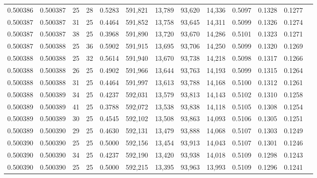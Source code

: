 \begin{tabular}{rrrrrrrrrrrrr}
0.500386 & 0.500387 &    25 &  28 &                                     0.5283 & 591,821 &  13,789 &  93,620 &  14,336 & 0.5097 & 0.1328 & 0.1277 \\
0.500387 & 0.500387 &    31 &  25 &                                     0.4464 & 591,852 &  13,758 &  93,645 &  14,311 & 0.5099 & 0.1326 & 0.1274 \\
0.500387 & 0.500387 &    38 &  25 &                                     0.3968 & 591,890 &  13,720 &  93,670 &  14,286 & 0.5101 & 0.1323 & 0.1271 \\
0.500387 & 0.500388 &    25 &  36 &                                     0.5902 & 591,915 &  13,695 &  93,706 &  14,250 & 0.5099 & 0.1320 & 0.1269 \\
0.500388 & 0.500388 &    25 &  32 &                                     0.5614 & 591,940 &  13,670 &  93,738 &  14,218 & 0.5098 & 0.1317 & 0.1266 \\
0.500388 & 0.500388 &    26 &  25 &                                     0.4902 & 591,966 &  13,644 &  93,763 &  14,193 & 0.5099 & 0.1315 & 0.1264 \\
0.500388 & 0.500388 &    31 &  25 &                                     0.4464 & 591,997 &  13,613 &  93,788 &  14,168 & 0.5100 & 0.1312 & 0.1261 \\
0.500388 & 0.500389 &    34 &  25 &                                     0.4237 & 592,031 &  13,579 &  93,813 &  14,143 & 0.5102 & 0.1310 & 0.1258 \\
0.500389 & 0.500389 &    41 &  25 &                                     0.3788 & 592,072 &  13,538 &  93,838 &  14,118 & 0.5105 & 0.1308 & 0.1254 \\
0.500389 & 0.500389 &    30 &  25 &                                     0.4545 & 592,102 &  13,508 &  93,863 &  14,093 & 0.5106 & 0.1305 & 0.1251 \\
0.500389 & 0.500390 &    29 &  25 &                                     0.4630 & 592,131 &  13,479 &  93,888 &  14,068 & 0.5107 & 0.1303 & 0.1249 \\
0.500390 & 0.500390 &    25 &  25 &                                     0.5000 & 592,156 &  13,454 &  93,913 &  14,043 & 0.5107 & 0.1301 & 0.1246 \\
0.500390 & 0.500390 &    34 &  25 &                                     0.4237 & 592,190 &  13,420 &  93,938 &  14,018 & 0.5109 & 0.1298 & 0.1243 \\
0.500390 & 0.500390 &    25 &  25 &                                     0.5000 & 592,215 &  13,395 &  93,963 &  13,993 & 0.5109 & 0.1296 & 0.1241 \\

\end{tabular}
